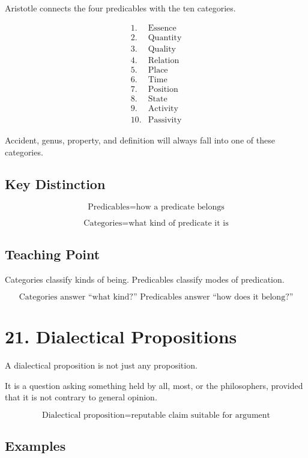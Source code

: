 \documentclass[12pt]{article}
\begin{document}
Aristotle connects the four predicables with the ten categories.

\[
\begin{array}{ll}
1. & \text{Essence} \\
2. & \text{Quantity} \\
3. & \text{Quality} \\
4. & \text{Relation} \\
5. & \text{Place} \\
6. & \text{Time} \\
7. & \text{Position} \\
8. & \text{State} \\
9. & \text{Activity} \\
10. & \text{Passivity}
\end{array}
\]

Accident, genus, property, and definition will always fall into one of these
categories.

\subsection*{Key Distinction}

\[
\text{Predicables} = \text{how a predicate belongs}
\]

\[
\text{Categories} = \text{what kind of predicate it is}
\]

\subsection*{Teaching Point}

Categories classify kinds of being. Predicables classify modes of predication.

\[
\boxed{
\text{Categories answer ``what kind?'' Predicables answer ``how does it belong?''}
}
\]

\section*{21. Dialectical Propositions}

A dialectical proposition is not just any proposition.

It is a question asking something held by all, most, or the philosophers,
provided that it is not contrary to general opinion.

\[
\boxed{
\text{Dialectical proposition} = \text{reputable claim suitable for argument}
}
\]

\subsection*{Examples}
\end{document}
